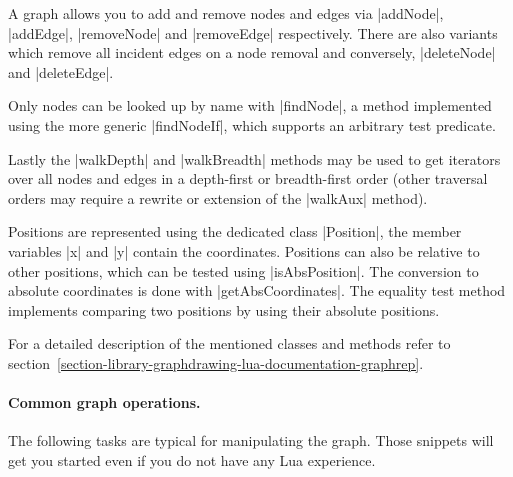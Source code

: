 A graph allows you to add and remove nodes and edges via |addNode|,
|addEdge|, |removeNode| and |removeEdge| respectively.  There are also
variants which remove all incident edges on a node removal and
conversely, |deleteNode| and |deleteEdge|.

Only nodes can be looked up by name with |findNode|, a
method implemented using the more generic |findNodeIf|, which supports
an arbitrary test predicate.

Lastly the |walkDepth| and |walkBreadth| methods may be used to get
iterators over all nodes and edges in a depth-first or breadth-first
order (other traversal orders may require a rewrite or extension of the
|walkAux| method).

Positions are represented using the dedicated class |Position|, the member
variables |x| and |y| contain the coordinates.  Positions can also be
relative to other positions, which can be tested using |isAbsPosition|.
The conversion to absolute coordinates is done with |getAbsCoordinates|.
The equality test method implements comparing two positions by using their
absolute positions.

For a detailed description of the mentioned classes and methods refer
to section~\ref{section-library-graphdrawing-lua-documentation-graphrep}.

\paragraph{Common graph operations.}
The following tasks are typical for manipulating the graph.
Those snippets will get you started even if you do not have any Lua
experience.

